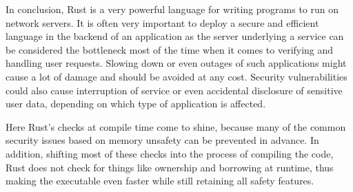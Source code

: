 In conclusion, Rust is a very powerful language for writing programs to run on network servers. It is often very
important to deploy a secure and efficient language in the backend of an application as the server underlying a service
can be considered the bottleneck most of the time when it comes to verifying and handling user requests. Slowing down
or even outages of such applications might cause a lot of damage and should be avoided at any cost. Security
vulnerabilities could also cause interruption of service or even accidental disclosure of sensitive user data,
depending on which type of application is affected.

Here Rust's checks at compile time come to shine, because many of the common security issues based on memory unsafety
can be prevented in advance. In addition, shifting most of these checks into the process of compiling the code, Rust
does not check for things like ownership and borrowing at runtime, thus making the executable even faster while still
retaining all safety features.

